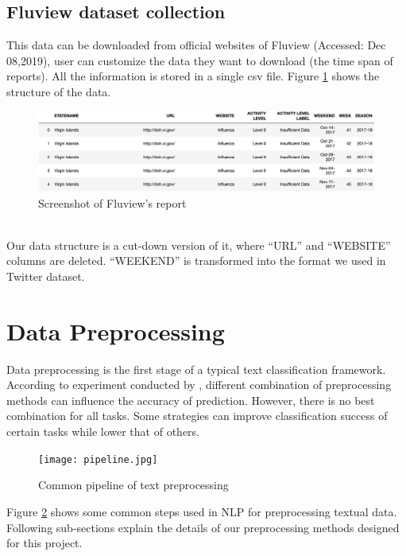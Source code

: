 \subsection{Fluview dataset collection}
This data can be downloaded from official websites of Fluview \cite{cdc:fluView} (Accessed: Dec 08,2019), user can customize the data they want to download (the time span of reports). All the information is stored in a single csv file. Figure \ref{fig:fluView1} shows the structure of the data. 
\begin{figure}[!htbp]
    \center
    \includegraphics[width=5.5in]{images/fluView1.png}
    \caption{Screenshot of Fluview's report}
    \label{fig:fluView1}
\end{figure}
\\
Our data structure is a cut-down version of it, where ``URL'' and ``WEBSITE'' columns are deleted. ``WEEKEND'' is transformed into the format we used in Twitter dataset.

\section{Data Preprocessing}
\label{sec:Preprocessing}
Data preprocessing is the first stage of a typical text classification framework. According to experiment conducted by \cite{uysal2014impact}, different combination of preprocessing methods can influence the accuracy of prediction. However, there is no best combination for all tasks. Some strategies can improve classification success of certain tasks while lower that of others.
\begin{figure}[!htbp]
    \centering
    \texttt{[image: pipeline.jpg]}
    \caption{Common pipeline of text preprocessing}
    \label{fig:pipeline}
\end{figure} 
Figure \ref{fig:pipeline} shows some common steps used in NLP for preprocessing textual data. Following sub-sections explain the details of our preprocessing methods designed for this project.
